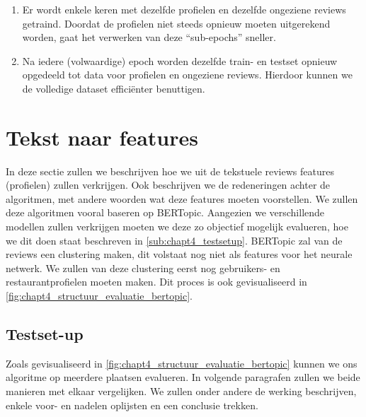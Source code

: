\begin{enumerate}
    \item Er wordt enkele keren met dezelfde profielen en dezelfde ongeziene reviews getraind. Doordat de profielen niet steeds opnieuw moeten uitgerekend worden, gaat het verwerken van deze ``sub-epochs'' sneller.

    \item Na iedere (volwaardige) epoch worden dezelfde train- en testset opnieuw opgedeeld tot data voor profielen en ongeziene reviews. Hierdoor kunnen we de volledige dataset efficiënter benuttigen.
\end{enumerate}



\section{Tekst naar features}
\label{sec:chapt4_tekst_naar_features}
In deze sectie zullen we beschrijven hoe we uit de tekstuele reviews features (profielen) zullen verkrijgen. Ook beschrijven we de redeneringen achter de algoritmen, met andere woorden wat deze features moeten voorstellen. We zullen deze algoritmen vooral baseren op BERTopic. Aangezien we verschillende modellen zullen verkrijgen moeten we deze zo objectief mogelijk evalueren, hoe we dit doen staat beschreven in \autoref{sub:chapt4_testsetup}. BERTopic zal van de reviews een clustering maken, dit volstaat nog niet als features voor het neurale netwerk. We zullen van deze clustering eerst nog gebruikers- en restaurantprofielen moeten maken. Dit proces is ook gevisualiseerd in \autoref{fig:chapt4_structuur_evaluatie_bertopic}.


\subsection{Testset-up}
\label{sub:chapt4_testsetup}
Zoals gevisualiseerd in \autoref{fig:chapt4_structuur_evaluatie_bertopic} kunnen we ons algoritme op meerdere plaatsen evalueren. In volgende paragrafen zullen we beide manieren met elkaar vergelijken. We zullen onder andere de werking beschrijven, enkele voor- en nadelen oplijsten en een conclusie trekken.

